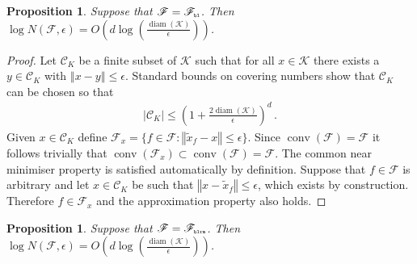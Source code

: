 \documentclass[letter, 12pt]{report}
\newcommand{\pr}{\text{\tiny\texttt{r}}}
\newcommand{\pb}{\text{\tiny\texttt{b}}}
\newcommand{\pl}{\text{\tiny\texttt{l}}}
\renewcommand{\pm}{\text{\tiny\texttt{m}}}
\newcommand{\norm}[1]{\left \Vert  #1 \right \Vert}
\newcommand{\cK}{\mathcal K}
\newcommand{\cC}{\mathcal C}
\newcommand{\sF}{\mathscr F}
\newcommand{\conv}{\operatorname{conv}}
\newcommand{\diam}{\operatorname{diam}}
\newcommand{\1}{\mathbf{1}}
\theoremstyle{plain}
\newtheorem{proposition}[theorem]{Proposition}
\theoremstyle{definition}
\theoremstyle{remark}
\begin{document}
\begin{proposition}\label{prop:N}
    Suppose that $\sF = \sF_{\pb\pl}$. Then $\log N(\sF, \epsilon) = O\left(d \log\left(\frac{\diam(\cK)}{\epsilon}\right)\right)$.
\end{proposition}
\begin{proof}
    Let $\cC_K$ be a finite subset of $\cK$ such that for all $x \in \cK$ there exists a $y \in \cC_K$ with $\norm{x - y} \leq \epsilon$.
    Standard bounds on covering numbers \citep[\S4]{ASG15} show that $\cC_K$ can be chosen so that
    \begin{align*}
        |\cC_K| \leq \left(1 + \frac{2\diam(\cK)}{\epsilon}\right)^d \,.
    \end{align*}
    Given $x \in \cC_K$ define $\sF_x = \{f \in \sF : \norm{\tilde x_f - x} \leq \epsilon\}$.
    Since $\conv(\sF) = \sF$ it follows trivially that $\conv(\sF_x) \subset \conv(\sF) = \sF$.
    The common near minimiser property is satisfied automatically by definition.
    Suppose that $f \in \sF$ is arbitrary and let $x \in \cC_K$ be such that $\norm{x - \tilde x_f} \leq \epsilon$, which exists by construction.
    Therefore $f \in \sF_x$ and the approximation property also holds.
\end{proof}

\begin{proposition}\label{prop:N-ridge}
    Suppose that $\sF = \sF_{\pb\pl\pr\pm}$. Then $\log N(\sF, \epsilon) = O\left(d \log\left(\frac{\diam(\cK)}{\epsilon}\right)\right)$.
\end{proposition}
\end{document}
